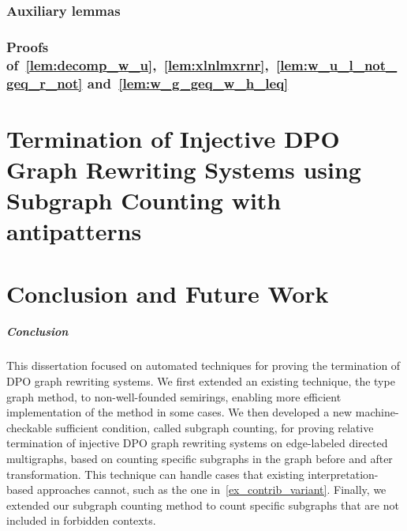 \documentclass{report}
\begin{document}
\subsection*{Auxiliary lemmas}

\subsection*{Proofs of~\autoref{lem:decomp_w_u},~\autoref{lem:xlnlmxrnr},~\autoref{lem:w_u_l_not_geq_r_not} and~\autoref{lem:w_g_geq_w_h_leq}}
\label{sec:appendix:a}


% 



% 




\chapter{Termination of Injective DPO Graph Rewriting
Systems using Subgraph Counting with antipatterns}
 

 

\chapter{Conclusion and Future Work}
\paragraph{Conclusion}
This dissertation focused on automated techniques for proving the termination of DPO graph rewriting systems.
We first extended an existing technique, the type graph method, to non-well-founded semirings, enabling more efficient implementation of the method in some cases.
We then developed a new machine-checkable sufficient condition, called subgraph counting, for proving relative termination of injective DPO graph rewriting systems on edge-labeled directed multigraphs, based on counting specific subgraphs in the graph before and after transformation. This technique can handle cases that existing interpretation-based approaches cannot, such as the one in~\autoref{ex_contrib_variant}.
Finally, we extended our subgraph counting method to count specific subgraphs that are not included in forbidden contexts.
\end{document}
